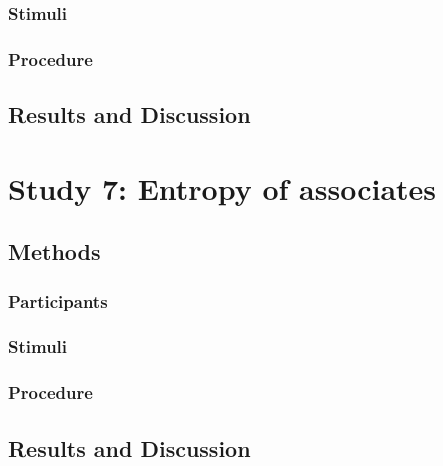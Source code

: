 \subsubsection{Stimuli} 
\subsubsection{Procedure}
\subsection{Results and Discussion}

\section{Study 7: Entropy of associates}
\subsection{Methods}
\subsubsection{Participants} 
\subsubsection{Stimuli} 
\subsubsection{Procedure}
\subsection{Results and Discussion}







